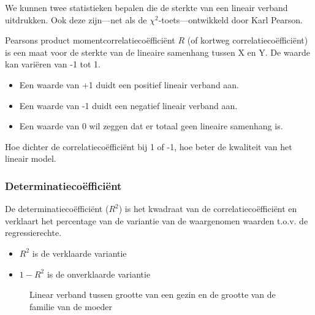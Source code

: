 We kunnen twee statistieken bepalen die de sterkte van een lineair verband uitdrukken. Ook deze zijn---net als de $\chi^2$-toets---ontwikkeld door Karl Pearson.

\begin{definition}
   Pearsons product momentcorrelatiecoëfficiënt $R$ (of kortweg correlatiecoëfficiënt) is een maat voor de sterkte van de lineaire samenhang tussen X en Y. De waarde kan vari\"eren van -1 tot 1.

  \begin{itemize}
    \item Een waarde van +1 duidt een positief lineair verband aan.
    \item Een waarde van -1 duidt een negatief lineair verband aan.
    \item Een waarde van 0 wil zeggen dat er totaal geen lineaire samenhang is.
  \end{itemize}
  
  Hoe dichter de correlatiecoëfficiënt bij 1 of -1, hoe beter de kwaliteit van het lineair model.
\end{definition}

\subsubsection{Determinatieco\"effici\"ent}

\begin{definition}
  De determinatieco\"effici\"ent ($R^{2}$) is het kwadraat van de correlatieco\"effici\"ent en verklaart het percentage van de variantie van de waargenomen waarden t.o.v. de regressierechte.

  \begin{itemize}
    \item $R^{2}$ is de verklaarde variantie
    \item $1-R^{2}$ is de onverklaarde variantie
  \end{itemize}
\end{definition}

\begin{figure}[t]
  \caption{Linear verband tussen grootte van een gezin en de grootte van de familie van de moeder}
  \label{fig:moederVerband}
\end{figure}

